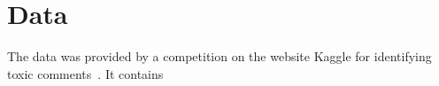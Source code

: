\chapter{Data}
The data was provided by a competition on the website Kaggle for identifying toxic comments~\cite{toxic-kaggle}. It contains 
